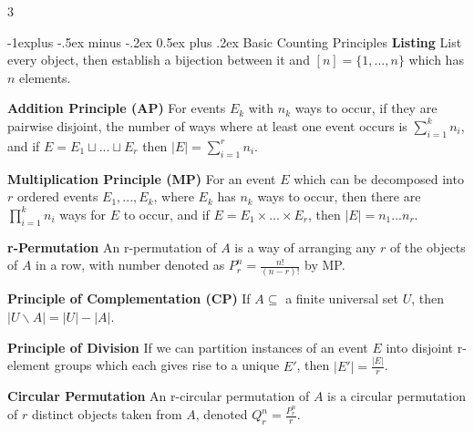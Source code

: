 \documentclass[10pt, landscape]{article}
\makeatletter
\renewcommand{\section}{\@startsection{section}{1}{0mm}%
                                {-1ex plus -.5ex minus -.2ex}%
                                {0.5ex plus .2ex}%
                                {\normalfont\large\bfseries}}
\renewcommand{\section}{\@startsection{section}{2}{0mm}%
                                {-1explus -.5ex minus -.2ex}%
                                {0.5ex plus .2ex}%
                                {\normalfont\normalsize\bfseries}}
\makeatother
\begin{document}
\raggedright
\footnotesize
\begin{multicols*}{3}

\setlength{\columnseprule}{0.25pt}
\setlength{\premulticols}{1pt}
\setlength{\postmulticols}{1pt}
\setlength{\multicolsep}{1pt}
\setlength{\columnsep}{2pt}

\begin{center}
\end{center}

\section{Basic Counting Principles}
\textbf{Listing} List every object, then establish a bijection between it and $[n]=\{1,...,n\}$ which has $n$ elements.

\textbf{Addition Principle (AP)} For events $E_k$ with $n_k$ ways to occur, if they are pairwise disjoint, the number of ways where at least one event occurs is $\sum_{i=1}^kn_i$, and if $E=E_1\sqcup...\sqcup E_r$ then $|E|=\sum_{i=1}^rn_i$.

\textbf{Multiplication Principle (MP)} For an event $E$ which can be decomposed into $r$ ordered events $E_1,...,E_k$, where $E_k$ has $n_k$ ways to occur, then there are $\prod_{i=1}^k n_i$ ways for $E$ to occur, and if $E=E_1\times...\times E_r$, then $|E|=n_1...n_r$.

\textbf{r-Permutation} An r-permutation of $A$ is a way of arranging any $r$ of the objects of $A$ in a row, with number denoted as $P_r^n=\frac{n!}{(n-r)!}$ by MP.

\textbf{Principle of Complementation (CP)} If $A\subseteq$ a finite universal set $U$, then $|U\backslash A|=|U|-|A|$.

\textbf{Principle of Division} If we can partition instances of an event $E$ into disjoint r-element groups which each gives rise to a unique $E'$, then $|E'|=\frac{|E|}{r}$.

\textbf{Circular Permutation} An r-circular permutation of $A$ is a circular permutation of $r$ distinct objects taken from $A$, denoted $Q_r^n=\frac{P_r^n}{r}$.


\end{multicols*}
\end{document}
